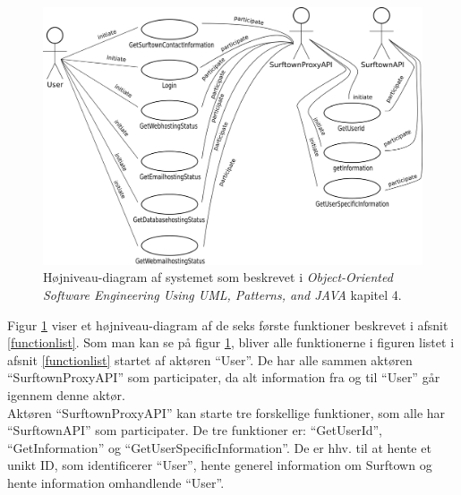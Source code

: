 \documentclass[12pt]{article}
\begin{document}
\begin{figure}[!h]
	\centering
	\includegraphics[width=13cm]{high_level_diagramv2.png}
	\caption{Højniveau-diagram af systemet som beskrevet i \emph{Object-Oriented Software Engineering Using UML, Patterns, and JAVA}\cite{OOSE} kapitel 4.}
	\label{highleveldiagram}
\end{figure}


Figur \ref{highleveldiagram} viser et højniveau-diagram af de seks første funktioner beskrevet i afsnit \ref{functionlist}. Som man kan se på figur \ref{highleveldiagram}, bliver alle funktionerne i figuren listet i afsnit \ref{functionlist} startet af aktøren ``User''. De har alle sammen aktøren ``SurftownProxyAPI'' som participater, da alt information fra og til ``User'' går igennem denne aktør.\\Aktøren ``SurftownProxyAPI'' kan starte tre forskellige funktioner, som alle har ``SurftownAPI'' som participater. De tre funktioner er: ``GetUserId'', ``GetInformation'' og ``GetUserSpecificInformation''. De er hhv. til at hente et unikt ID, som identificerer ``User'', hente generel information om Surftown og hente information omhandlende ``User''. 
\end{document}
